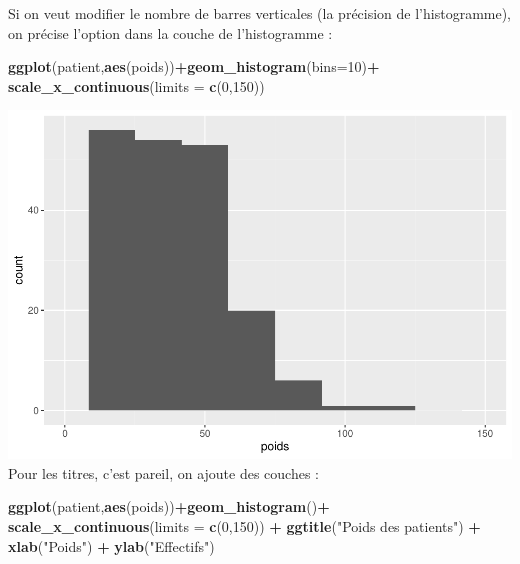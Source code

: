 \documentclass[
]{book}
\newenvironment{Shaded}{\begin{snugshade}}{\end{snugshade}}
\newcommand{\AttributeTok}[1]{\textcolor[rgb]{0.13,0.29,0.53}{#1}}
\newcommand{\DecValTok}[1]{\textcolor[rgb]{0.00,0.00,0.81}{#1}}
\newcommand{\FunctionTok}[1]{\textcolor[rgb]{0.13,0.29,0.53}{\textbf{#1}}}
\newcommand{\NormalTok}[1]{#1}
\newcommand{\SpecialCharTok}[1]{\textcolor[rgb]{0.81,0.36,0.00}{\textbf{#1}}}
\newcommand{\StringTok}[1]{\textcolor[rgb]{0.31,0.60,0.02}{#1}}
\begin{document}
Si on veut modifier le nombre de barres verticales (la précision de l'histogramme),
on précise l'option dans la couche de l'histogramme :

\begin{Shaded}
\begin{Highlighting}[]
\FunctionTok{ggplot}\NormalTok{(patient,}\FunctionTok{aes}\NormalTok{(poids))}\SpecialCharTok{+}\FunctionTok{geom\_histogram}\NormalTok{(}\AttributeTok{bins=}\DecValTok{10}\NormalTok{)}\SpecialCharTok{+}
  \FunctionTok{scale\_x\_continuous}\NormalTok{(}\AttributeTok{limits =} \FunctionTok{c}\NormalTok{(}\DecValTok{0}\NormalTok{,}\DecValTok{150}\NormalTok{))}
\end{Highlighting}
\end{Shaded}

\includegraphics{_main_files/figure-latex/ggplot5-1.pdf}
Pour les titres, c'est pareil, on ajoute des couches :

\begin{Shaded}
\begin{Highlighting}[]
\FunctionTok{ggplot}\NormalTok{(patient,}\FunctionTok{aes}\NormalTok{(poids))}\SpecialCharTok{+}\FunctionTok{geom\_histogram}\NormalTok{()}\SpecialCharTok{+}
  \FunctionTok{scale\_x\_continuous}\NormalTok{(}\AttributeTok{limits =} \FunctionTok{c}\NormalTok{(}\DecValTok{0}\NormalTok{,}\DecValTok{150}\NormalTok{)) }\SpecialCharTok{+} 
  \FunctionTok{ggtitle}\NormalTok{(}\StringTok{"Poids des patients"}\NormalTok{) }\SpecialCharTok{+} 
  \FunctionTok{xlab}\NormalTok{(}\StringTok{"Poids"}\NormalTok{) }\SpecialCharTok{+} 
  \FunctionTok{ylab}\NormalTok{(}\StringTok{"Effectifs"}\NormalTok{)}
\end{Highlighting}
\end{Shaded}
\end{document}
